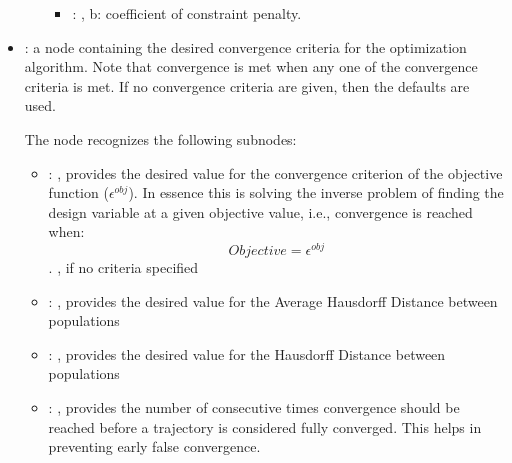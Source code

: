 \begin{itemize}
\begin{itemize}
\begin{itemize}
            \item {}: , 
              b: coefficient of constraint penalty.
          \end{itemize}
      \end{itemize}

    \item {}:
      a node containing the desired convergence criteria for the optimization algorithm.
      Note that convergence is met when any one of the convergence criteria is met. If no
      convergence               criteria are given, then the defaults are used.

      The  node recognizes the following subnodes:
      \begin{itemize}
        \item {}: , 
          provides the desired value for the convergence criterion of the objective function
          ($\epsilon^{obj}$). In essence this is solving the inverse problem of finding the design
          variable                         at a given objective value, i.e., convergence is reached
          when: $$ Objective = \epsilon^{obj}$$.                        , if no
          criteria specified

        \item {}: , 
          provides the desired value for the Average Hausdorff Distance between populations

        \item {}: , 
          provides the desired value for the Hausdorff Distance between populations

        \item {}: , 
          provides the number of consecutive times convergence should be reached before a trajectory
          is considered fully converged. This helps in preventing early false convergence.
      \end{itemize}


\end{itemize}
